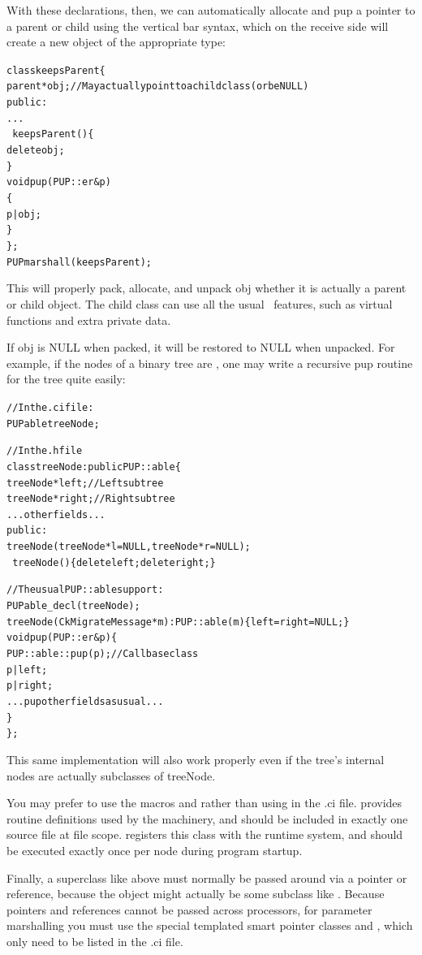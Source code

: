 With these declarations, then, we can automatically 
allocate and pup a pointer to a parent or child
using the vertical bar  syntax, which on the receive
side will create a new object of the appropriate type:

\begin{alltt}
class keepsParent \{
    parent *obj; //May actually point to a child class (or be NULL)
public:
    ...
    ~keepsParent() \{
        delete obj;
    \}
    void pup(PUP::er &p) 
    \{
        p|obj;
    \}
\};
PUPmarshall(keepsParent);
\end{alltt}

This will properly pack, allocate, and unpack obj whether
it is actually a parent or child object.  The child class 
can use all the usual \CC\ features, such as virtual functions
and extra private data.

If obj is NULL when packed, it will be restored to NULL when unpacked.
For example, if the nodes of a binary tree are ,
one may write a recursive pup routine for the tree quite easily:

\begin{alltt}
// In the .ci file:
    PUPable treeNode;

// In the .h file
class treeNode : public PUP::able \{
    treeNode *left;//Left subtree
    treeNode *right;//Right subtree
    ... other fields ...
public:
    treeNode(treeNode *l=NULL, treeNode *r=NULL);
    ~treeNode() \{delete left; delete right;\}
    
    // The usual PUP::able support:
    PUPable\_decl(treeNode);
    treeNode(CkMigrateMessage *m) : PUP::able(m) \{ left=right=NULL; \}
    void pup(PUP::er &p) \{
        PUP::able::pup(p);//Call base class
        p|left;
        p|right;
        ... pup other fields as usual ...
    \}
\};
\end{alltt}

This same implementation will also work properly even if the tree's
internal nodes are actually subclasses of treeNode.

You may prefer to use the macros 
and  rather than using 
in the .ci file.   provides routine definitions used
by the  machinery, and should be included in exactly one
source file at file scope.   registers this class
with the runtime system, and should be executed exactly once per node 
during program startup.

Finally, a  superclass like  above 
must normally be passed around via a pointer or reference, because the object
might actually be some subclass like .  Because
pointers and references cannot be passed across processors,
for parameter marshalling you must use the special templated 
smart pointer classes  and ,
which only need to be listed in the .ci file.

